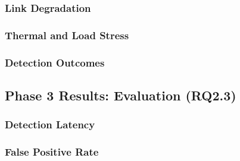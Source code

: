 
\subsubsection{Link Degradation}\label{sec:rq2-fault-link}


\subsubsection{Thermal and Load Stress}\label{sec:rq2-fault-thermal}


\subsubsection{Detection Outcomes}\label{sec:rq2-confusion}


\subsection{Phase 3 Results: Evaluation (RQ2.3)}\label{sec:rq2-phase3}

\subsubsection{Detection Latency}\label{sec:rq2-latency}


\subsubsection{False Positive Rate}\label{sec:rq2-fp-rate}


